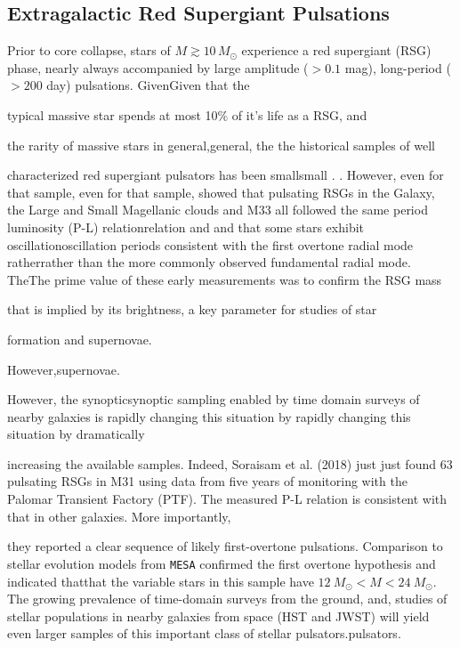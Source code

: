{\color{green}
{\color{green}
\subsection{Extragalactic Red Supergiant Pulsations}
}}




Prior to core collapse, stars of $M \! \gtrsim \! 10 \, M_\odot$ experience a red
supergiant (RSG) phase, nearly always accompanied by large amplitude
($>0.1$ mag), long-period ($>200 $ day) pulsations.  GivenGiven that the

typical massive star spends at most 10$\%$ of it's life as a RSG, and

the rarity of massive stars in general,general, the the historical samples of well

characterized red supergiant pulsators has been smallsmall \citep[see][for a nice compilation]{Yang_2012}. \citep[see][for a nice compilation]{Yang_2012}. However, even for that sample, even for that sample, \citet{Yang_2012} showed that pulsating RSGs in the Galaxy, the Large and Small Magellanic clouds and M33 all followed the
same period luminosity (P-L) relationrelation and and that some stars exhibit
oscillationoscillation periods consistent with the first overtone radial mode
ratherrather than the more commonly observed fundamental radial mode. TheThe
prime value of these early measurements was to confirm the RSG mass

that is implied by its brightness, a key parameter for studies of star

formation and supernovae.

However,supernovae.

However, the synopticsynoptic sampling enabled by time domain surveys of
nearby galaxies is rapidly changing this situation by rapidly changing this situation by dramatically

increasing the available samples. Indeed, Soraisam et al. (2018) just
just
found 63 pulsating RSGs in M31 using data from five years of
monitoring with the Palomar Transient Factory (PTF). The measured P-L
relation is consistent with that in other galaxies. More importantly,

they reported a clear sequence of likely first-overtone
pulsations. Comparison to stellar evolution models from \texttt{MESA}
confirmed the first overtone hypothesis and indicated thatthat the
variable stars in this sample have $12~M_{\odot} \! < \! M \! < \! 24~M_{\odot}$. The growing prevalence of time-domain surveys from the ground, and, studies 
of stellar populations in nearby galaxies from space (HST and JWST) 
will yield even larger samples of this important class of stellar pulsators.pulsators. 